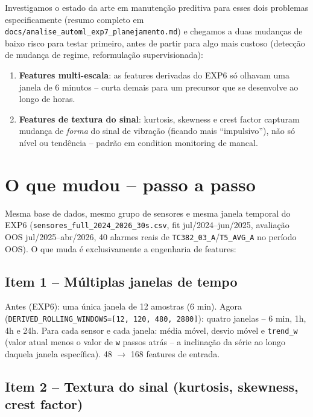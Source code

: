 \documentclass[11pt,a4paper]{article}
\begin{document}
Investigamos o estado da arte em manutenção preditiva para esses dois
problemas especificamente (resumo completo em
\texttt{docs/analise\_automl\_exp7\_planejamento.md}) e chegamos a duas
mudanças de baixo risco para testar primeiro, antes de partir para algo
mais custoso (detecção de mudança de regime, reformulação supervisionada):

\begin{enumerate}
  \item \textbf{Features multi-escala}: as features derivadas do EXP6 só
        olhavam uma janela de 6 minutos -- curta demais para um precursor
        que se desenvolve ao longo de horas.
  \item \textbf{Features de textura do sinal}: kurtosis, skewness e crest
        factor capturam mudança de \emph{forma} do sinal de vibração (ficando
        mais ``impulsivo''), não só nível ou tendência -- padrão em condition
        monitoring de mancal.
\end{enumerate}

\section{O que mudou -- passo a passo}
\label{sec:mudancas}

Mesma base de dados, mesmo grupo de sensores e mesma janela temporal do
EXP6 (\texttt{sensores\_full\_2024\_2026\_30s.csv}, fit jul/2024--jun/2025,
avaliação OOS jul/2025--abr/2026, 40 alarmes reais de
\texttt{TC382\_03\_A}/\texttt{T5\_AVG\_A} no período OOS). O que muda é
exclusivamente a engenharia de features:

\subsection{Item 1 -- Múltiplas janelas de tempo}

Antes (EXP6): uma única janela de 12 amostras (6 min). Agora
(\texttt{DERIVED\_ROLLING\_WINDOWS=[12, 120, 480, 2880]}): quatro janelas
-- 6 min, 1h, 4h e 24h. Para cada sensor e cada janela: média móvel, desvio
móvel e \texttt{trend\_w} (valor atual menos o valor de \texttt{w} passos
atrás -- a inclinação da série ao longo daquela janela específica).
48 $\to$ 168 features de entrada.

\subsection{Item 2 -- Textura do sinal (kurtosis, skewness, crest factor)}
\end{document}

